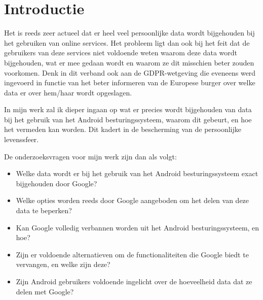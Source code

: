 
\section{Introductie} %
\label{sec:introductie}



Het is reeds zeer actueel dat er heel veel persoonlijke data wordt bijgehouden bij het gebruiken van online services. Het probleem ligt dan ook bij het feit dat de gebruikers van deze services niet voldoende weten waarom deze data wordt bijgehouden, wat er mee gedaan wordt en waarom ze dit misschien beter zouden voorkomen. Denk in dit verband ook aan de GDPR-wetgeving die eveneens werd ingevoerd in functie van het beter informeren van de Europese burger over welke data er over hem/haar wordt opgeslagen. 

\vspace{3mm}

\noindent In mijn werk zal ik dieper ingaan op wat er precies wordt bijgehouden van data bij het gebruik van het Android besturingssysteem, waarom dit gebeurt, en hoe het vermeden kan worden. Dit kadert in de bescherming van de persoonlijke levenssfeer. 

\vspace{3mm}

\noindent De onderzoeksvragen voor mijn werk zijn dan als volgt:


\begin{itemize}
	\item Welke data wordt er bij het gebruik van het Android besturingssysteem exact bijgehouden door Google?
	\item Welke opties worden reeds door Google aangeboden om het delen van deze data te beperken?
	\item Kan Google volledig verbannen worden uit het Android besturingssysteem, en hoe?
	\item Zijn er voldoende alternatieven om de functionaliteiten die Google biedt te vervangen, en welke zijn deze?
	\item Zijn Android gebruikers voldoende ingelicht over de hoeveelheid data dat ze delen met Google?
\end{itemize}


